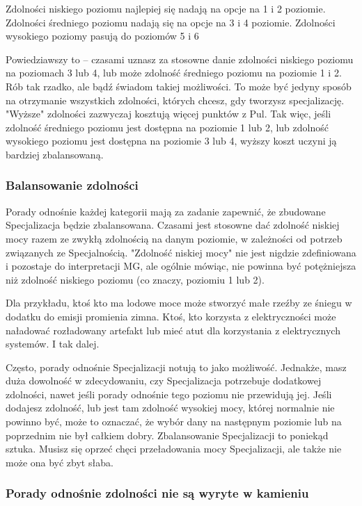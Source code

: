 Zdolności niskiego poziomu najlepiej się nadają na opcje na 1 i 2 poziomie. Zdolności średniego poziomu nadają się na opcje na 3 i 4 poziomie. Zdolności wysokiego poziomy pasują do poziomów 5 i 6

Powiedziawszy to – czasami uznasz za stosowne danie zdolności niskiego poziomu na poziomach 3 lub 4, lub może zdolność średniego poziomu na poziomie 1 i 2. Rób tak rzadko, ale bądź świadom takiej możliwości. To może być jedyny sposób na otrzymanie wszystkich zdolności, których chcesz, gdy tworzysz specjalizację. "Wyższe" zdolności zazwyczaj kosztują więcej punktów z Pul. Tak więc, jeśli zdolność średniego poziomu jest dostępna na poziomie 1 lub 2, lub zdolność wysokiego poziomu jest dostępna na poziomie 3 lub 4, wyższy koszt uczyni ją bardziej zbalansowaną.

\subsubsection{Balansowanie zdolności}

Porady odnośnie każdej kategorii mają za zadanie zapewnić, że zbudowane Specjalizacja będzie zbalansowana. Czasami jest stosowne dać zdolność niskiej mocy razem ze zwykłą zdolnością na danym poziomie, w zależności od potrzeb związanych ze Specjalnością. "Zdolność niskiej mocy" nie jest nigdzie zdefiniowana i pozostaje do interpretacji MG, ale ogólnie mówiąc, nie powinna być potężniejsza niż zdolność niskiego poziomu (co znaczy, poziomiu 1 lub 2).

Dla przykładu, ktoś kto ma lodowe moce może stworzyć małe rzeźby ze śniegu w dodatku do emisji promienia zimna. Ktoś, kto korzysta z elektryczności może naładować rozładowany artefakt lub mieć atut dla korzystania z elektrycznych systemów. I tak dalej.

Często, porady odnośnie Specjalizacji notują to jako możliwość. Jednakże, masz duża dowolność w zdecydowaniu, czy Specjalizacja potrzebuje dodatkowej zdolności, nawet jeśli porady odnośnie tego poziomu nie przewidują jej. Jeśli dodajesz zdolność, lub jest tam zdolność wysokiej mocy, której normalnie nie powinno być, może to oznaczać, że wybór dany na następnym poziomie lub na poprzednim nie był całkiem dobry. Zbalansowanie Specjalizacji to poniekąd sztuka. Musisz się oprzeć chęci przeładowania mocy Specjalizacji, ale także nie może ona być zbyt słaba.

\subsubsection{Porady odnośnie zdolności nie są wyryte w kamieniu}

